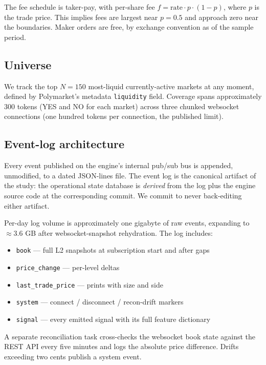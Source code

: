 \documentclass[review,12pt,authoryear]{elsarticle}
\begin{document}
The fee schedule is taker-pay, with per-share fee
\(f = \text{rate} \cdot p \cdot (1-p)\), where \(p\) is the trade price.
This implies fees are largest near \(p = 0.5\) and approach zero near the
boundaries. Maker orders are free, by exchange convention as of the
sample period.

\subsection{Universe}

We track the top \(N=150\) most-liquid currently-active markets at any
moment, defined by Polymarket's metadata \texttt{liquidity} field.
Coverage spans approximately \num{300} tokens (YES and NO for each market)
across three chunked websocket connections (one hundred tokens per
connection, the published limit).

\subsection{Event-log architecture}

Every event published on the engine's internal pub/sub bus is appended,
unmodified, to a dated JSON-lines file. The event log is the canonical
artifact of the study: the operational state database is \emph{derived}
from the log plus the engine source code at the corresponding commit.
We commit to never back-editing either artifact.

Per-day log volume is approximately one gigabyte of raw events,
expanding to \(\approx 3.6\) GB after websocket-snapshot rehydration. The
log includes:
\begin{itemize}[noitemsep]
\item \texttt{book} --- full L2 snapshots at subscription start and after gaps
\item \texttt{price\_change} --- per-level deltas
\item \texttt{last\_trade\_price} --- prints with size and side
\item \texttt{system} --- connect / disconnect / recon-drift markers
\item \texttt{signal} --- every emitted signal with its full feature dictionary
\end{itemize}

A separate reconciliation task cross-checks the websocket book state
against the REST API every five minutes and logs the absolute price
difference. Drifts exceeding two cents publish a system event.
\end{document}
